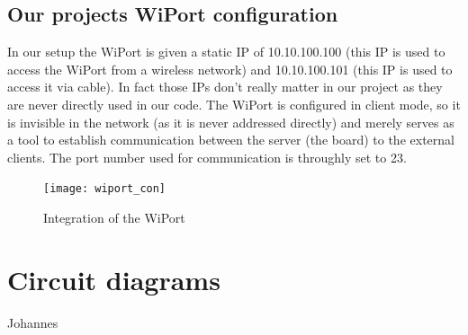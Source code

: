 \subsection{Our projects WiPort configuration}
In our setup the WiPort is given a static IP of 10.10.100.100 (this IP is used to access the WiPort from a wireless network) and 
10.10.100.101 (this IP is used to access it via cable). In fact those IPs don't really matter in our project as they are never directly used in our code. 
The WiPort is configured in client mode, so it is invisible in the network (as it is never addressed directly) and merely serves as a tool
to establish communication between the server (the board) to the external clients. The port number used for communication is throughly set to 23. 




\begin{figure}[hb]
\centering
\texttt{[image: wiport\_con]}
\caption {Integration of the WiPort}
\end{figure}

\section{Circuit diagrams}
Johannes
